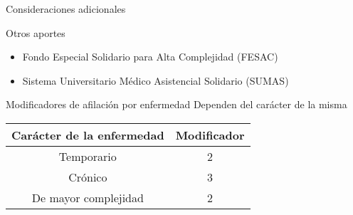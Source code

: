\documentclass[10pt]{beamer}
\begin{document}
\begin{frame}{Consideraciones adicionales}
    \begin{block}{Otros aportes}
        \begin{itemize}
            \item Fondo Especial Solidario para Alta Complejidad (FESAC)
            \item Sistema Universitario Médico Asistencial Solidario (SUMAS)
        \end{itemize}
    \end{block}
    \begin{block}{Modificadores de afilación por enfermedad}
        Dependen del carácter de la misma
        \begin{table}
            \centering
        \begin{tabular}{|c|c|}
            \hline
            Carácter de la enfermedad & Modificador \\ \hline
            Temporario & 2 \\ \hline
            Crónico & 3 \\ \hline
            De mayor complejidad & 2 \\ \hline
        \end{tabular}
        \end{table}
    \end{block}
\end{frame}
\begin{comment}
Además del monto resultante de la aplicación de las fórmulas presentadas, dependiente de la categoría y subcategoría del afiliado, existen algunos aportes adicionales. Algunos de estos aportes son obligatorios, y otros opcionales.
Estos incluyen (aportes en la slide)

Por otra parte, para los voluntarios jubilados, en el caso de que estos ingresen a DOSPU con condiciones preexistentes, se aplica un modificador según la naturaleza de la condición (cuadro de la slide).
\end{comment}






\end{document}
